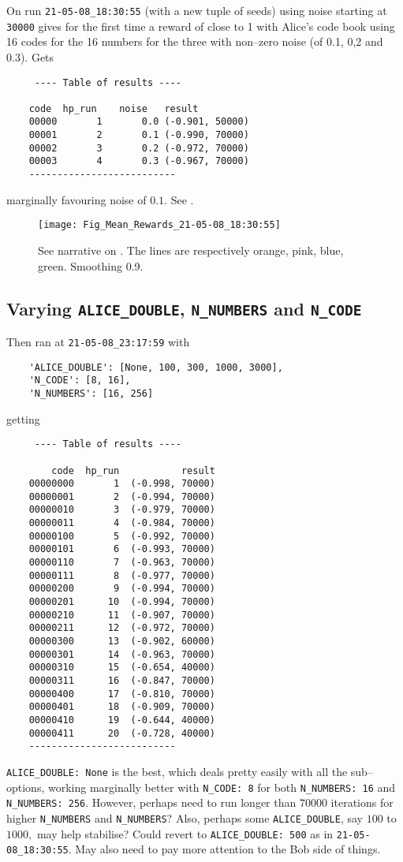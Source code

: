 \documentclass[12pt]{article}
\begin{document}
On run \verb|21-05-08_18:30:55| (with a new tuple of seeds) using noise starting at \verb|30000| gives for the first time a reward of close to 1 with Alice's code book using 16 codes for the 16 numbers for the three with non--zero noise (of 0.1, 0,2 and 0.3).  Gets
\begin{lstlisting}
	 ---- Table of results ----
	
	code  hp_run	noise	result
	00000       1  		0.0	(-0.901, 50000)
	00001       2  	    0.1	(-0.990, 70000)
	00002       3  		0.2	(-0.972, 70000)
	00003       4  		0.3	(-0.967, 70000)
	--------------------------
\end{lstlisting}
marginally favouring noise of $0.1.$
See .
\begin{figure}
	\centering
	\texttt{[image: Fig\_Mean\_Rewards\_21-05-08\_18:30:55]}
	\caption{See narrative on .  The lines are respectively orange, pink, blue, green.  Smoothing 0.9.}
	\label{fig:figmeanrewards21-05-08183055}
\end{figure}

\subsection{Varying \texttt{ALICE\_DOUBLE}, \texttt{N\_NUMBERS} and \texttt{N\_CODE}}

Then ran at \verb|21-05-08_23:17:59| with 
\begin{lstlisting}
	'ALICE_DOUBLE': [None, 100, 300, 1000, 3000],
	'N_CODE': [8, 16],
	'N_NUMBERS': [16, 256]
\end{lstlisting}
getting 
\begin{lstlisting}
	 ---- Table of results ----
	
		code  hp_run  		   result
	00000000       1  (-0.998, 70000)
	00000001       2  (-0.994, 70000)
	00000010       3  (-0.979, 70000)
	00000011       4  (-0.984, 70000)
	00000100       5  (-0.992, 70000)
	00000101       6  (-0.993, 70000)
	00000110       7  (-0.963, 70000)
	00000111       8  (-0.977, 70000)
	00000200       9  (-0.994, 70000)
	00000201      10  (-0.994, 70000)
	00000210      11  (-0.907, 70000)
	00000211      12  (-0.972, 70000)
	00000300      13  (-0.902, 60000)
	00000301      14  (-0.963, 70000)
	00000310      15  (-0.654, 40000)
	00000311      16  (-0.847, 70000)
	00000400      17  (-0.810, 70000)
	00000401      18  (-0.909, 70000)
	00000410      19  (-0.644, 40000)
	00000411      20  (-0.728, 40000)
	--------------------------
\end{lstlisting}
\verb|ALICE_DOUBLE: None| is the best, which deals pretty easily with all the sub--options, working marginally better with \verb|N_CODE: 8| for both \verb|N_NUMBERS: 16| and \verb|N_NUMBERS: 256|.  However, perhaps need to run longer than $\num{70000}$ iterations for higher \verb|N_NUMBERS| and \verb|N_NUMBERS|? Also, perhaps some \verb|ALICE_DOUBLE|, say $100$ to $\num{1000},$ may help stabilise?  Could revert to \verb|ALICE_DOUBLE: 500| as in \verb|21-05-08_18:30:55|.  May also need to pay more attention to the Bob side of things.
\end{document}
